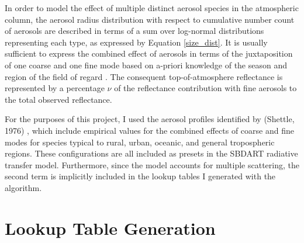 \documentclass[12pt]{article}
\begin{document}
In order to model the effect of multiple distinct aerosol species in the atmospheric column, the aerosol radius distribution with respect to cumulative number count of aerosols are described in terms of a sum over log-normal distributions representing each type, as expressed by Equation \ref{size_dist}. It is usually sufficient to express the combined effect of aerosols in terms of the juxtaposition of one coarse and one fine mode based on a-priori knowledge of the season and region of the field of regard \cite{kaufman_satellite_2002}. The consequent top-of-atmosphere reflectance is represented by a percentage $\nu$ of the reflectance contribution with fine aerosols to the total observed reflectance.

For the purposes of this project, I used the aerosol profiles identified by (Shettle, 1976) \cite{shettle_models_1976}, which include empirical values for the combined effects of coarse and fine modes for species typical to rural, urban, oceanic, and general tropospheric regions. These configurations are all included as presets in the SBDART radiative transfer model. Furthermore, since the model accounts for multiple scattering, the second term is implicitly included in the lookup tables I generated with the algorithm.

\section{Lookup Table Generation}
\end{document}
